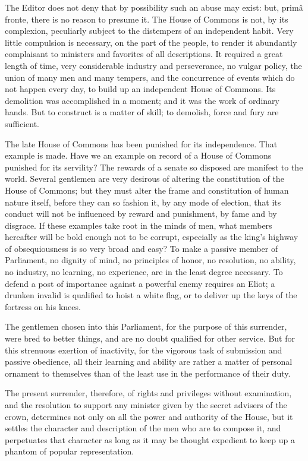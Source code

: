 The Editor does not deny that by possibility such an abuse may exist: but, primâ fronte, there is no reason to presume it. The House of Commons is not, by its complexion, peculiarly subject to the distempers of an independent habit. Very little compulsion is necessary, on the part of the people, to render it abundantly complaisant to ministers and favorites of all descriptions. It required a great length of time, very considerable industry and perseverance, no vulgar policy, the union of many men and many tempers, and the concurrence of events which do not happen every day, to build up an independent House of Commons. Its demolition was accomplished in a moment; and it was the work of ordinary hands. But to construct is a matter of skill; to demolish, force and fury are sufficient.

The late House of Commons has been punished for its independence. That example is made. Have we an example on record of a House of Commons punished for its servility? The rewards of a senate so disposed are manifest to the world. Several gentlemen are very desirous of altering the constitution of the House of Commons; but they must alter the frame and constitution of human nature itself, before they can so fashion it, by any mode of election, that its conduct will not be influenced by reward and punishment, by fame and by disgrace. If these examples take root in the minds of men, what members hereafter will be bold enough not to be corrupt, especially as the king's highway of obsequiousness is so very broad and easy? To make a passive member of Parliament, no dignity of mind, no principles of honor, no resolution, no ability, no industry, no learning, no experience, are in the least degree necessary. To defend a post of importance against a powerful enemy requires an Eliot; a drunken invalid is qualified to hoist a white flag, or to deliver up the keys of the fortress on his knees.

The gentlemen chosen into this Parliament, for the purpose of this surrender, were bred to better things, and are no doubt qualified for other service. But for this strenuous exertion of inactivity, for the vigorous task of submission and passive obedience, all their learning and ability are rather a matter of personal ornament to themselves than of the least use in the performance of their duty.

The present surrender, therefore, of rights and privileges without examination, and the resolution to support any minister given by the secret advisers of the crown, determines not only on all the power and authority of the House, but it settles the character and description of the men who are to compose it, and perpetuates that character as long as it may be thought expedient to keep up a phantom of popular representation.

